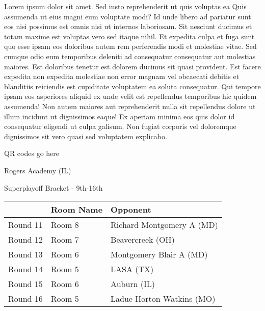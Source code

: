 \documentclass{article}%
\begin{document}
\vspace*{8pt}%
\linebreak%
\newline%
\newline%
    Lorem ipsum dolor sit amet. Sed iusto reprehenderit ut quis voluptas ea Quis assumenda ut eius magni eum voluptate modi? Id unde libero ad pariatur sunt eos nisi possimus est omnis nisi ut internos laboriosam. Sit nesciunt ducimus et totam maxime est voluptas vero sed itaque nihil. Et expedita culpa et fuga sunt quo esse ipsam eos doloribus autem rem perferendis modi et molestiae vitae.\newline%
\newline%
    Sed cumque odio eum temporibus deleniti ad consequatur consequatur aut molestias maiores. Est doloribus tenetur est dolorem ducimus sit quasi provident. Est facere expedita non expedita molestiae non error magnam vel obcaecati debitis et blanditiis reiciendis est cupiditate voluptatem ea soluta consequatur. Qui tempore ipsam eos asperiores aliquid ex unde velit est repellendus temporibus hic quidem assumenda!\newline%
\newline%
    Non autem maiores aut reprehenderit nulla sit repellendus dolore ut illum incidunt ut dignissimos eaque! Ex aperiam minima eos quis dolor id consequatur eligendi ut culpa galisum. Non fugiat corporis vel doloremque dignissimos sit vero quasi sed voluptatem explicabo.\newline%
\newline%
\vspace*{30pt}%
\begin{center}%
\begin{Huge}%
QR codes go here%
\end{Huge}%
\end{center}%
\newpage%
\begin{center}%
\begin{Huge}%
Rogers Academy (IL)%
\end{Huge}%
\vspace*{8pt}%
\linebreak%
\begin{Large}%
Superplayoff Bracket {-} 9th{-}16th%
\end{Large}%
\end{center}%
%
\begin{tabularx}{\textwidth}{|c|Y|Y|}%
\hline%
&Room Name&Opponent\\%
\hline%
Round 11&Room 8&Richard Montgomery A (MD)\\%
Round 12&Room 7&Beavercreek (OH)\\%
Round 13&Room 6&Montgomery Blair A (MD)\\%
Round 14&Room 5&LASA (TX)\\%
Round 15&Room 6&Auburn (IL)\\%
Round 16&Room 5&Ladue Horton Watkins (MO)\\%
\hline%
\end{tabularx}%
\end{document}
